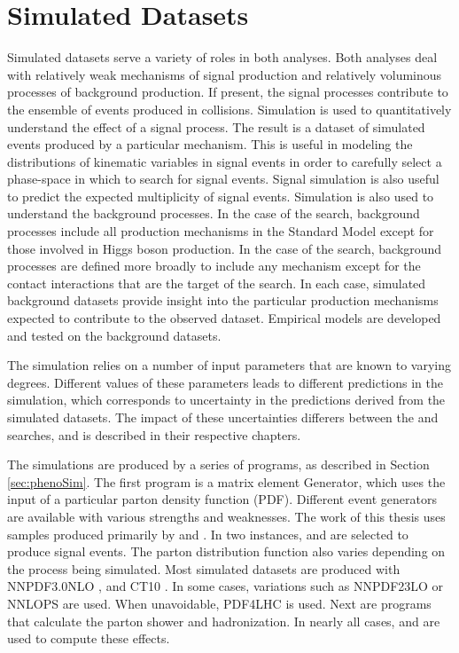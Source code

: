 \section{Simulated Datasets}\label{sec:physSim}

Simulated datasets serve a variety of roles in both analyses.
Both analyses deal with relatively weak mechanisms of signal production and relatively voluminous processes of background production.
If present, the signal processes contribute to the ensemble of events produced in collisions.
Simulation is used to quantitatively understand the effect of a signal process.
The result is a dataset of simulated events produced by a particular mechanism.
This is useful in modeling the distributions of kinematic variables in signal events in order to carefully select a phase-space in which to search for signal events.
Signal simulation is also useful to predict the expected multiplicity of signal events.
Simulation is also used to understand the background processes.
In the case of the \hmm search, background processes include all production mechanisms in the Standard Model except for those involved in Higgs boson production.
In the case of the \nr search, background processes are defined more broadly to include any mechanism except for the contact interactions that are the target of the search.
In each case, simulated background datasets provide insight into the particular production mechanisms expected to contribute to the observed dataset.
Empirical models are developed and tested on the background datasets.

The simulation relies on a number of input parameters that are known to varying degrees.
Different values of these parameters leads to different predictions in the simulation, which corresponds to uncertainty in the predictions derived from the simulated datasets.
The impact of these uncertainties differers between the \hmm and \nr searches, and is described in their respective chapters.

The simulations are produced by a series of programs, as described in Section \ref{sec:phenoSim}.
The first program is a matrix element Generator, which uses the input of a particular parton density function (PDF).
Different event generators are available with various strengths and weaknesses.
The work of this thesis uses samples produced primarily by \sherpa \cite{Gleisberg:2008ta} and \powheg \cite{Alioli:2010xd,Frixione:2007vw}.
In two instances, \pythia \cite{pythia8} and \madgraph \cite{Alwall:2014hca} are selected to produce signal events.
The parton distribution function also varies depending on the process being simulated.
Most simulated datasets are produced with NNPDF3.0NLO \cite{Ball:2014uwa}, and CT10 \cite{ct10}.
In some cases, variations such as NNPDF23LO \cite{Ball:2012cx} or NNLOPS \cite{Hamilton:2013fea} are used.
When unavoidable, PDF4LHC \cite{Butterworth:2015oua} is used.
Next are programs that calculate the parton shower and hadronization.
In nearly all cases, \pythia and \evtgen are used to compute these effects.


